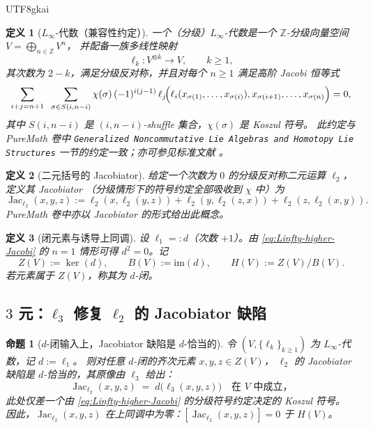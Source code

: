 \documentclass[12pt]{article}
\newtheorem{definition}{定义}[section]
\newtheorem{proposition}{命题}[section]
\newcommand{\Layer}{\ensuremath{\ell}}
\newcommand{\Jac}{\operatorname{Jac}}
\begin{document}
\begin{CJK*}{UTF8}{gkai}
\begin{definition}[$L_\infty$-代数（兼容性约定）]
一个（分级）$L_\infty$-代数是一个 $\mathbb{Z}$-分级向量空间
$V=\bigoplus_{n\in\mathbb{Z}}V^n$，
并配备一族多线性映射
\[
  \Layer_k: V^{\otimes k}\to V,\qquad k\ge 1,
\]
其次数为 $2-k$，满足分级反对称，并且对每个 $n\ge 1$ 满足高阶 Jacobi 恒等式
\begin{equation}
\label{eq:Linfty-higher-Jacobi}
\sum_{i+j=n+1}\;\;
\sum_{\sigma\in S(i,n-i)}
\chi(\sigma)\,
(-1)^{i(j-1)}\,
\Layer_j\!\Bigl(\Layer_i(x_{\sigma(1)},\dots,x_{\sigma(i)}),
x_{\sigma(i+1)},\dots,x_{\sigma(n)}\Bigr)=0,
\end{equation}
其中 $S(i,n-i)$ 是 $(i,n-i)$-shuffle 集合，$\chi(\sigma)$ 是 Koszul 符号。
此约定与 PureMath 卷中
\texttt{Generalized Noncommutative Lie Algebras and Homotopy Lie Structures}
一节的约定一致；亦可参见标准文献 \cite{LadaStasheff1993,LadaMarkl1995}。
\end{definition}

\begin{definition}[二元括号的 Jacobiator]
给定一个次数为 $0$ 的分级反对称二元运算 $\Layer_2$，定义其 Jacobiator
（分级情形下的符号约定全部吸收到 $\chi$ 中）为
\[
  \Jac_{\Layer_2}(x,y,z)
  :=
  \Layer_2(x,\Layer_2(y,z))
  + \Layer_2(y,\Layer_2(z,x))
  + \Layer_2(z,\Layer_2(x,y)).
\]
PureMath 卷中亦以 \emph{Jacobiator} 的形式给出此概念。
\end{definition}

\begin{definition}[闭元素与诱导上同调]
设 $\Layer_1=:d$（次数 $+1$）。由 \eqref{eq:Linfty-higher-Jacobi} 的 $n=1$ 情形可得
$d^2=0$。记
\[
  Z(V):=\ker(d),\qquad B(V):=\mathrm{im}(d),\qquad H(V):=Z(V)/B(V).
\]
若元素属于 $Z(V)$，称其为 \emph{$d$-闭}。
\end{definition}


\subsection{$3$ 元：$\Layer_3$ 修复 $\Layer_2$ 的 Jacobiator 缺陷}

\begin{proposition}[$d$-闭输入上，Jacobiator 缺陷是 $d$-恰当的]
\label{prop:arity3-repair}
令 $(V,\{\Layer_k\}_{k\ge 1})$ 为 $L_\infty$-代数，记 $d:=\Layer_1$。
则对任意 $d$-闭的齐次元素 $x,y,z\in Z(V)$，
$\Layer_2$ 的 Jacobiator 缺陷是 $d$-恰当的，其原像由 $\Layer_3$ 给出：
\begin{equation}
\label{eq:arity3-exact}
\Jac_{\Layer_2}(x,y,z)\;=\; d\bigl(\Layer_3(x,y,z)\bigr)
\quad\text{在 }V\text{ 中成立，}
\end{equation}
此处仅差一个由 \eqref{eq:Linfty-higher-Jacobi} 的分级符号约定决定的 Koszul 符号。
因此，$\Jac_{\Layer_2}(x,y,z)$ 在上同调中为零：$[\Jac_{\Layer_2}(x,y,z)]=0$ 于 $H(V)$。
\end{proposition}


\end{CJK*}
\end{document}
